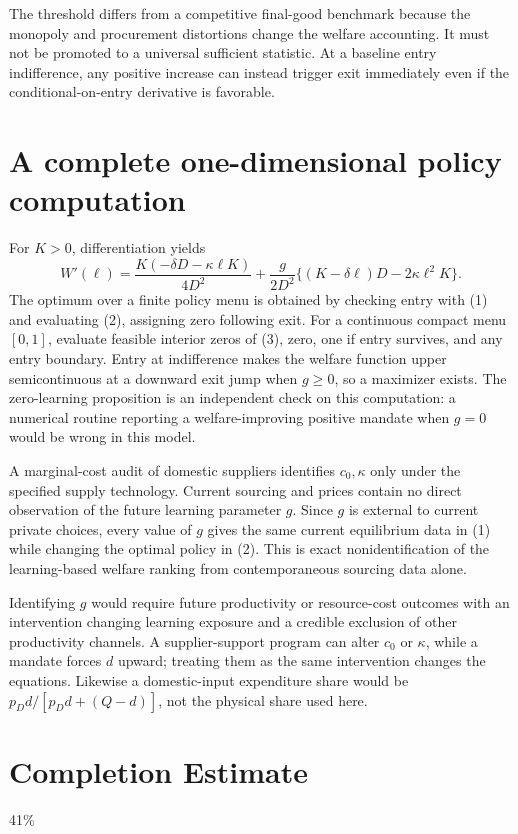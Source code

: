 \documentclass[11pt]{article}
\begin{document}
The threshold differs from a competitive final-good benchmark because the monopoly and procurement distortions change the welfare accounting. It must not be promoted to a universal sufficient statistic. At a baseline entry indifference, any positive increase can instead trigger exit immediately even if the conditional-on-entry derivative is favorable.

\section*{A complete one-dimensional policy computation}
For $K>0$, differentiation yields
\[
 W'(\ell)=\frac{K(-\delta D-\kappa\ell K)}{4D^2}
 +\frac g{2D^2}\{(K-\delta\ell)D-2\kappa\ell^2K\}. \tag{3}
\]
The optimum over a finite policy menu is obtained by checking entry with (1) and evaluating (2), assigning zero following exit. For a continuous compact menu $[0,1]$, evaluate feasible interior zeros of (3), zero, one if entry survives, and any entry boundary. Entry at indifference makes the welfare function upper semicontinuous at a downward exit jump when $g\geq0$, so a maximizer exists. The zero-learning proposition is an independent check on this computation: a numerical routine reporting a welfare-improving positive mandate when $g=0$ would be wrong in this model.

A marginal-cost audit of domestic suppliers identifies $c_0,\kappa$ only under the specified supply technology. Current sourcing and prices contain no direct observation of the future learning parameter $g$. Since $g$ is external to current private choices, every value of $g$ gives the same current equilibrium data in (1) while changing the optimal policy in (2). This is exact nonidentification of the learning-based welfare ranking from contemporaneous sourcing data alone.

Identifying $g$ would require future productivity or resource-cost outcomes with an intervention changing learning exposure and a credible exclusion of other productivity channels. A supplier-support program can alter $c_0$ or $\kappa$, while a mandate forces $d$ upward; treating them as the same intervention changes the equations. Likewise a domestic-input expenditure share would be $p_Dd/[p_Dd+(Q-d)]$, not the physical share used here.

\section{Completion Estimate}
41\%
\end{document}
